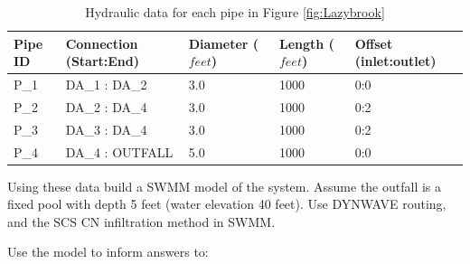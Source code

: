 \documentclass[12pt]{article}
\begin{document}
\begin{enumerate}
\begin{table}[ht!]
      \caption{Hydraulic data for each pipe in Figure \ref{fig:Lazybrook} \\}
   \begin{tabular}{| p{0.6in} | p{1.7in} | p{0.9in} | p{0.9in} | p{1.4in} |} %
   \hline
   \hline
Pipe ID & Connection (Start:End) & Diameter ($feet$) & Length ($feet$) & Offset (inlet:outlet) \\
\hline
\hline
P\_1 & DA\_1 : DA\_2 & 3.0 & 1000 & 0:0 \\
P\_2 & DA\_2 : DA\_4 & 3.0 & 1000 & 0:2 \\
P\_3 & DA\_3 : DA\_4 & 3.0 & 1000 & 0:2 \\
P\_4 & DA\_4 : OUTFALL & 5.0 & 1000 & 0:0\\
\hline
\hline
   \end{tabular}
   \label{tab:pipes}
\end{table}

Using these data build a SWMM model of the system.  Assume the outfall is a fixed pool with depth 5 feet (water elevation 40 feet).   Use DYNWAVE routing, and the SCS CN infiltration method in SWMM. 

Use the model to inform answers to:


\end{enumerate}
\end{document}
